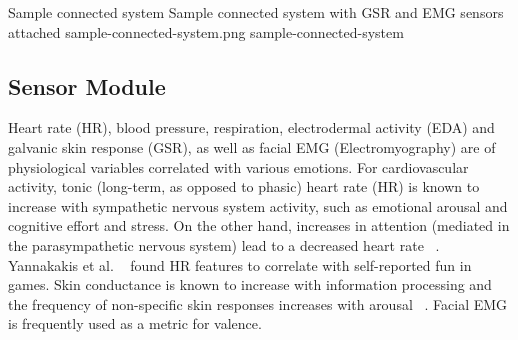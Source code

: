 \img
{Sample connected system}
{Sample connected system with GSR and EMG sensors attached}
{sample-connected-system.png}
{sample-connected-system}

\subsection{Sensor Module}

Heart rate (HR), blood pressure, respiration, electrodermal activity (EDA) and galvanic skin response (GSR), as well as facial EMG (Electromyography) are of physiological variables correlated with various emotions. %
For cardiovascular activity, tonic (long-term, as opposed to phasic) heart rate (HR) is known to increase with sympathetic nervous system activity, such as emotional arousal and cognitive effort and stress. On the other hand, increases in attention (mediated in the parasympathetic nervous system) lead to a decreased heart rate ~\cite{ravaja2004contributions}. Yannakakis et al. ~\cite{yannakakis2008entertainment} found HR features to correlate with self-reported fun in games. %
Skin conductance is known to increase with information processing and the frequency of non-specific skin responses increases with arousal ~\cite{ravaja2004contributions}. %
Facial EMG is frequently used as a metric for valence. %
